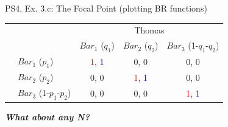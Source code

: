 \begin{frame}{PS4, Ex. 3.c: The Focal Point (plotting BR functions)}
\begin{table}
      \begin{tabular}{cl|c|c|c|}
        & \multicolumn{1}{c}{} & \multicolumn{3}{c}{\color{blue}Thomas}\\
        & \multicolumn{1}{c}{} & \multicolumn{1}{c}{$Bar_1$ ($q_1$)} & \multicolumn{1}{c}{$Bar_2$ ($q_2$)} & \multicolumn{1}{c}{$Bar_3$ (1-$q_1$-$q_2$)} \\\cline{3-5}
        \parbox[t]{1mm}{}
        & $Bar_1$ ($p_1$) & \textcolor{red}{1}, \textcolor{blue}{1} & 0, 0 & 0, 0 \\
        & $Bar_2$ ($p_2$) & 0, 0 & \textcolor{red}{1}, \textcolor{blue}{1} & 0, 0 \\
        & $Bar_3$ (1-$p_1$-$p_2$) & 0, 0 & 0, 0 & \textcolor{red}{1}, \textcolor{blue}{1} \\
      \end{tabular}
    \end{table}
    \textbf{\textit{What about any N?}}
  \vfill\null
\end{frame}
